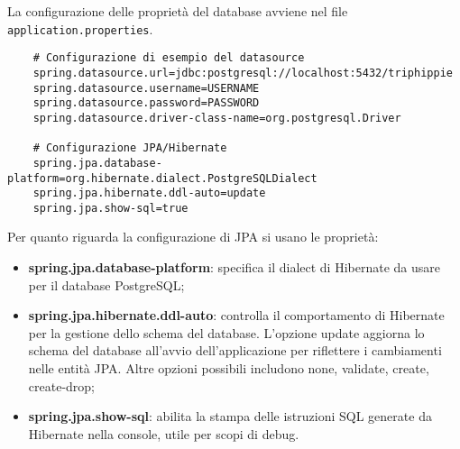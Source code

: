 \noindent
La configurazione delle proprietà del database avviene nel file \texttt{application.properties}.\\
\begin{lstlisting}
    # Configurazione di esempio del datasource
    spring.datasource.url=jdbc:postgresql://localhost:5432/triphippie
    spring.datasource.username=USERNAME
    spring.datasource.password=PASSWORD
    spring.datasource.driver-class-name=org.postgresql.Driver

    # Configurazione JPA/Hibernate
    spring.jpa.database-platform=org.hibernate.dialect.PostgreSQLDialect
    spring.jpa.hibernate.ddl-auto=update
    spring.jpa.show-sql=true
\end{lstlisting}
Per quanto riguarda la configurazione di JPA si usano le proprietà:
\begin{itemize}
    \item \textbf{spring.jpa.database-platform}: specifica il dialect di Hibernate da usare per il database PostgreSQL;
    \item \textbf{spring.jpa.hibernate.ddl-auto}: controlla il comportamento di Hibernate per la gestione dello schema del database. 
    L'opzione update aggiorna lo schema del database all'avvio dell'applicazione per riflettere i cambiamenti nelle entità JPA. 
    Altre opzioni possibili includono none, validate, create, create-drop;
    \item \textbf{spring.jpa.show-sql}: abilita la stampa delle istruzioni SQL generate da Hibernate nella console, utile per scopi di debug.
\end{itemize}

